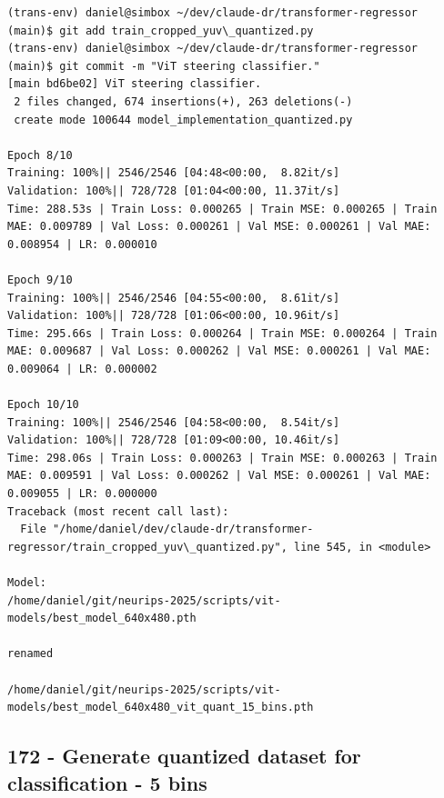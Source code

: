 \begin{verbatim}
(trans-env) daniel@simbox ~/dev/claude-dr/transformer-regressor (main)$ git add train_cropped_yuv\_quantized.py 
(trans-env) daniel@simbox ~/dev/claude-dr/transformer-regressor (main)$ git commit -m "ViT steering classifier."
[main bd6be02] ViT steering classifier.
 2 files changed, 674 insertions(+), 263 deletions(-)
 create mode 100644 model_implementation_quantized.py

Epoch 8/10
Training: 100%|| 2546/2546 [04:48<00:00,  8.82it/s]
Validation: 100%|| 728/728 [01:04<00:00, 11.37it/s]
Time: 288.53s | Train Loss: 0.000265 | Train MSE: 0.000265 | Train MAE: 0.009789 | Val Loss: 0.000261 | Val MSE: 0.000261 | Val MAE: 0.008954 | LR: 0.000010

Epoch 9/10
Training: 100%|| 2546/2546 [04:55<00:00,  8.61it/s]
Validation: 100%|| 728/728 [01:06<00:00, 10.96it/s]
Time: 295.66s | Train Loss: 0.000264 | Train MSE: 0.000264 | Train MAE: 0.009687 | Val Loss: 0.000262 | Val MSE: 0.000261 | Val MAE: 0.009064 | LR: 0.000002

Epoch 10/10
Training: 100%|| 2546/2546 [04:58<00:00,  8.54it/s]
Validation: 100%|| 728/728 [01:09<00:00, 10.46it/s]
Time: 298.06s | Train Loss: 0.000263 | Train MSE: 0.000263 | Train MAE: 0.009591 | Val Loss: 0.000262 | Val MSE: 0.000261 | Val MAE: 0.009055 | LR: 0.000000
Traceback (most recent call last):
  File "/home/daniel/dev/claude-dr/transformer-regressor/train_cropped_yuv\_quantized.py", line 545, in <module>

Model:
/home/daniel/git/neurips-2025/scripts/vit-models/best_model_640x480.pth

renamed

/home/daniel/git/neurips-2025/scripts/vit-models/best_model_640x480_vit_quant_15_bins.pth

\end{verbatim}



\subsection{172 - Generate quantized dataset for classification - 5 bins}
\label{app_res:172}

